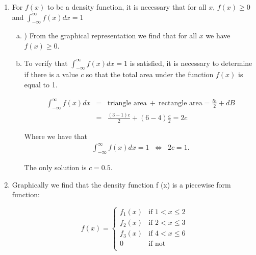 \documentclass[12pt,thmsa]{article}\usepackage[]{graphicx}\usepackage[]{color}
\begin{document}
\begin{enumerate}%


\item For $f(x)$ to be a density function, it is necessary that for all
$x$, $f(x) \ge 0$ and $\int_{-\infty}^{\infty}f(x)dx = 1$

  \begin{enumerate}[(a)]
  \item ) From the graphical representation we find that for all $x$ we have $f(x) \ge 0$. %
  \item To verify that $\int_{-\infty}^{\infty}f(x)dx = 1$  is satisfied, it is necessary to determine if there is a value $c$ so that the total area under the function $f(x)$ is equal to 1.


    \begin{eqnarray*}
      \int_{-\infty}^{\infty}f(x)dx  &=& \left. \text{triangle area} \ + \ \text{rectangle area} = \frac{lh}{2} + dB \right. \nonumber \\
       &=& \left. \frac{(3-1)c}{2} + (6-4)\frac{c}{2} = 2c \right. \nonumber
       \end{eqnarray*}

    Where we have that
       \begin{eqnarray*}
      \int_{-\infty}^{\infty}f(x)dx =1  &\iff& 2c =1.
    \end{eqnarray*}

    The only solution is $c = 0.5$.

  \end{enumerate}


\item Graphically we find that the density function f (x) is a piecewise form function:

  \begin{equation*}
    f(x) = \left\{
      \begin{array}{ll}
        f_1(x) &\text{if } 1 < x \le 2 \\
        f_2(x) &\text{if } 2 < x \le 3 \\
        f_3(x) &\text{if } 4 < x \le 6 \\
        0  & \text{if not} \\
      \end{array}
    \right.
  \end{equation*}


\end{enumerate}
\end{document}
